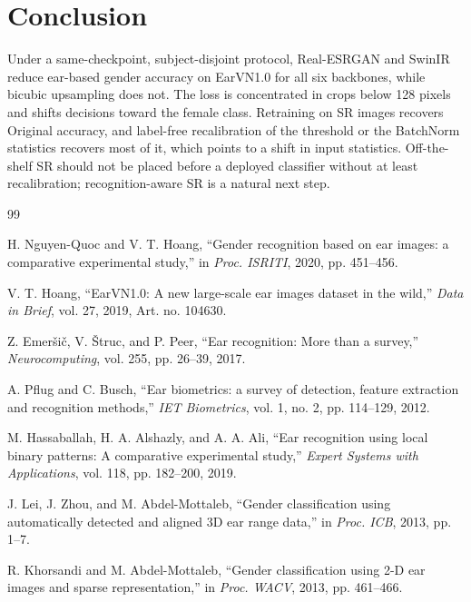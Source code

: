\documentclass[conference]{IEEEtran}
\begin{document}
\section{Conclusion}\label{sec:conclusion}
Under a same-checkpoint, subject-disjoint protocol, Real-ESRGAN and SwinIR reduce ear-based gender accuracy on EarVN1.0 for all six backbones, while bicubic upsampling does not. The loss is concentrated in crops below 128 pixels and shifts decisions toward the female class. Retraining on SR images recovers Original accuracy, and label-free recalibration of the threshold or the BatchNorm statistics recovers most of it, which points to a shift in input statistics. Off-the-shelf SR should not be placed before a deployed classifier without at least recalibration; recognition-aware SR is a natural next step.

\begin{thebibliography}{99}
\footnotesize
\setlength{\itemsep}{0pt}
\setlength{\parsep}{0pt}
\setlength{\topsep}{0pt}

H. Nguyen-Quoc and V. T. Hoang, ``Gender recognition based on ear images: a comparative experimental study,'' in \emph{Proc. ISRITI}, 2020, pp. 451--456.

V. T. Hoang, ``EarVN1.0: A new large-scale ear images dataset in the wild,'' \emph{Data in Brief}, vol. 27, 2019, Art. no. 104630.

Z. Emer\v{s}i\v{c}, V. \v{S}truc, and P. Peer, ``Ear recognition: More than a survey,'' \emph{Neurocomputing}, vol. 255, pp. 26--39, 2017.

A. Pflug and C. Busch, ``Ear biometrics: a survey of detection, feature extraction and recognition methods,'' \emph{IET Biometrics}, vol. 1, no. 2, pp. 114--129, 2012.

M. Hassaballah, H. A. Alshazly, and A. A. Ali, ``Ear recognition using local binary patterns: A comparative experimental study,'' \emph{Expert Systems with Applications}, vol. 118, pp. 182--200, 2019.

J. Lei, J. Zhou, and M. Abdel-Mottaleb, ``Gender classification using automatically detected and aligned 3D ear range data,'' in \emph{Proc. ICB}, 2013, pp. 1--7.

R. Khorsandi and M. Abdel-Mottaleb, ``Gender classification using 2-D ear images and sparse representation,'' in \emph{Proc. WACV}, 2013, pp. 461--466.


\end{thebibliography}
\end{document}
